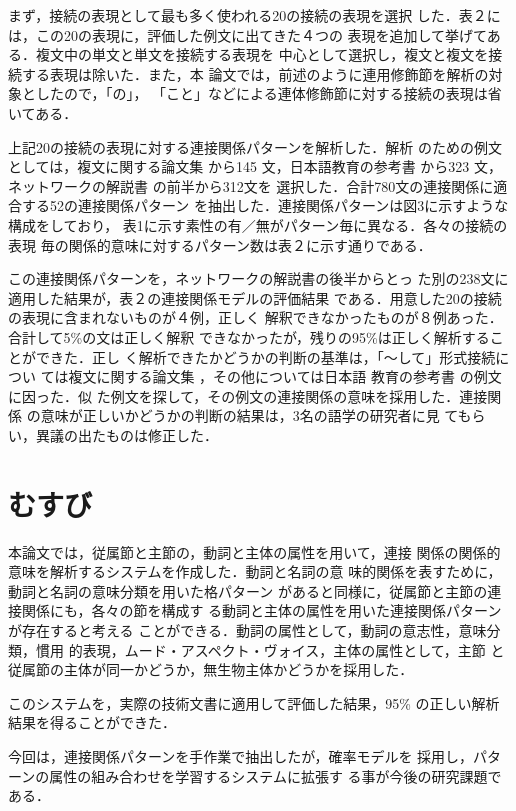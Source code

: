 まず，接続の表現として最も多く使われる20の接続の表現を選択
した．表２には，この20の表現に，評価した例文に出てきた４つの
表現を追加して挙げてある．複文中の単文と単文を接続する表現を
中心として選択し，複文と複文を接続する表現は除いた．また，本
論文では，前述のように連用修飾節を解析の対象としたので，「の」，
「こと」などによる連体修飾節に対する接続の表現は省いてある．

上記20の接続の表現に対する連接関係パターンを解析した．解析
のための例文としては，複文に関する論文集\cite{Jinta1995} から145
文，日本語教育の参考書\cite[など]{YokobayasiAndSimomura1988,Houjou1992} から323
文，ネットワークの解説書\cite{KaneutiAndImayasu1993} の前半から312文を
選択した．合計780文の連接関係に適合する52の連接関係パターン
を抽出した．連接関係パターンは図3に示すような構成をしており，
表1に示す素性の有／無がパターン毎に異なる．各々の接続の表現
毎の関係的意味に対するパターン数は表２に示す通りである．

この連接関係パターンを，ネットワークの解説書の後半からとっ
た別の238文に適用した結果が，表２の連接関係モデルの評価結果
である．用意した20の接続の表現に含まれないものが４例，正しく
解釈できなかったものが８例あった．合計して5\%の文は正しく解釈
できなかったが，残りの95\%は正しく解析することができた．正し
く解析できたかどうかの判断の基準は，「〜して」形式接続につい
ては複文に関する論文集\cite{Jinta1995} ，その他については日本語
教育の参考書\cite[など]{YokobayasiAndSimomura1988,Houjou1992} の例文に因った．似
た例文を探して，その例文の連接関係の意味を採用した．連接関係
の意味が正しいかどうかの判断の結果は，3名の語学の研究者に見
てもらい，異議の出たものは修正した．

\section{むすび}
本論文では，従属節と主節の，動詞と主体の属性を用いて，連接
関係の関係的意味を解析するシステムを作成した．動詞と名詞の意
味的関係を表すために，動詞と名詞の意味分類を用いた格パターン
があると同様に，従属節と主節の連接関係にも，各々の節を構成す
る動詞と主体の属性を用いた連接関係パターンが存在すると考える
ことができる．動詞の属性として，動詞の意志性，意味分類，慣用
的表現，ムード・アスペクト・ヴォイス，主体の属性として，主節
と従属節の主体が同一かどうか，無生物主体かどうかを採用した．

このシステムを，実際の技術文書に適用して評価した結果，95\%
の正しい解析結果を得ることができた．

今回は，連接関係パターンを手作業で抽出したが，確率モデルを
採用し，パターンの属性の組み合わせを学習するシステムに拡張す
る事が今後の研究課題である．



